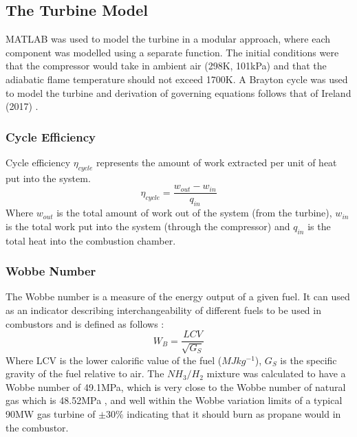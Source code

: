 \documentclass[11pt, oneside]{article}
\begin{document}
\subsection{The Turbine Model}
MATLAB was used to model the turbine in a modular approach, where each component was modelled using a separate function. The initial conditions were that the compressor would take in ambient air (298K, 101kPa) and that the adiabatic flame temperature should not exceed 1700K. A Brayton cycle was used to model the turbine and derivation of governing equations follows that of Ireland (2017) \cite{thermonotes}.

\subsubsection{Cycle Efficiency}
Cycle efficiency $\eta_{cycle}$ represents the amount of work extracted per unit of heat put into the system.
\begin{equation}
\eta_{cycle} = \frac{w_{out} - w_{in}}{q_{in}}
\end{equation}
Where $w_{out}$ is the total amount of work out of the system (from the turbine), $w_{in}$ is the total work put into the system (through the compressor) and $q_{in}$ is the total heat into the combustion chamber.

\subsubsection{Wobbe Number} 
The Wobbe number is a measure of the energy output of a given fuel. It can used as an indicator describing interchangeability of different fuels to be used in combustors and is defined as follows \cite{website:wobbe}: 
\begin{equation}
W_B = \frac{LCV}{\sqrt{G_S}}
\end{equation}
Where LCV is the lower calorific value of the fuel ($MJ kg^{-1}$), $G_S$ is the specific gravity of the fuel relative to air. The $NH_3/H_2$ mixture was calculated to have a Wobbe number of 49.1MPa, which is very close to the Wobbe number of natural gas which is 48.52MPa \cite{website:wobbe}, and well within the Wobbe variation limits of a typical 90MW gas turbine of $\pm 30\%$ \cite{PDF:GE} indicating that it should burn as propane would in the combustor. 
\end{document}
